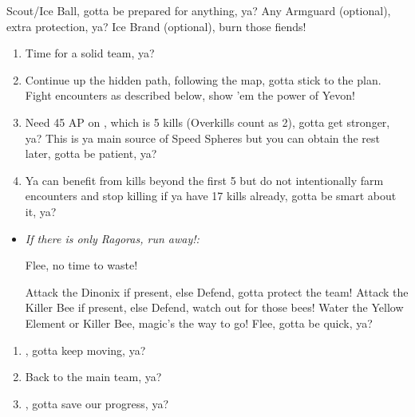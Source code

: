 \begin{equip}
    \begin{itemize}
        \wakkaf Scout/Ice Ball, gotta be prepared for anything, ya?
        \wakkaf Any Armguard (optional), extra protection, ya?
        \tidusf Ice Brand (optional), burn those fiends!
    \end{itemize}
\end{equip}
\begin{enumerate}[resume]
    \item \formation{\tidus}{\wakka}{\lulu} Time for a solid team, ya?
    \item Continue up the hidden path, following the map, gotta stick to the plan. Fight encounters as described below, show 'em the power of Yevon!
    \item Need 45 AP on \tidus, which is 5 kills (Overkills count as 2), gotta get stronger, ya? This is ya main source of Speed Spheres but you can obtain the rest later, gotta be patient, ya?
    \item Ya can benefit from kills beyond the first 5 but do not intentionally farm encounters and stop killing if ya have 17 kills already, gotta be smart about it, ya?
\end{enumerate}
\begin{encounters}
    \begin{itemize}
        \item \textit{If there is only Ragoras, run away!: }
        \begin{itemize}
            \tidusf Flee, no time to waste!
        \end{itemize}
        \tidusf Attack the Dinonix if present, else Defend, gotta protect the team!
        \wakkaf Attack the Killer Bee if present, else Defend, watch out for those bees!
        \luluf Water the Yellow Element or Killer Bee, magic's the way to go!
        \tidusf Flee, gotta be quick, ya?
    \end{itemize}
\end{encounters}
\begin{enumerate}[resume]
    \item \sd, gotta keep moving, ya?
    \item \formation{\tidus}{\yuna}{\lulu} Back to the main team, ya?
    \item \save, gotta save our progress, ya?
\end{enumerate}
